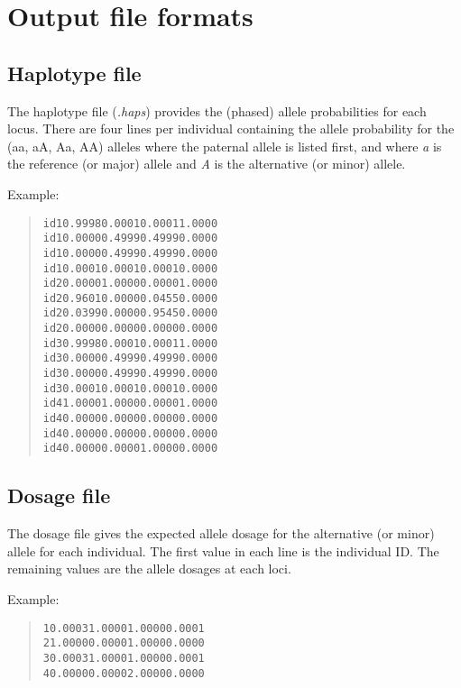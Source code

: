 \documentclass[a4paper]{article}
\begin{document}
\section{Output file formats%
  \label{output-file-formats}%
}


\subsection{Haplotype file%
  \label{haplotype-file}%
}

The haplotype file (\emph{.haps}) provides the (phased) allele probabilities for each locus. There are four lines per individual containing the allele probability for the (aa, aA, Aa, AA) alleles where the paternal allele is listed first, and where \emph{a} is the reference (or major) allele and \emph{A} is the alternative (or minor) allele.

Example:

\begin{quote}
\begin{alltt}
id1    0.9998    0.0001    0.0001    1.0000
id1    0.0000    0.4999    0.4999    0.0000
id1    0.0000    0.4999    0.4999    0.0000
id1    0.0001    0.0001    0.0001    0.0000
id2    0.0000    1.0000    0.0000    1.0000
id2    0.9601    0.0000    0.0455    0.0000
id2    0.0399    0.0000    0.9545    0.0000
id2    0.0000    0.0000    0.0000    0.0000
id3    0.9998    0.0001    0.0001    1.0000
id3    0.0000    0.4999    0.4999    0.0000
id3    0.0000    0.4999    0.4999    0.0000
id3    0.0001    0.0001    0.0001    0.0000
id4    1.0000    1.0000    0.0000    1.0000
id4    0.0000    0.0000    0.0000    0.0000
id4    0.0000    0.0000    0.0000    0.0000
id4    0.0000    0.0000    1.0000    0.0000
\end{alltt}
\end{quote}


\subsection{Dosage file%
  \label{dosage-file}%
}

The dosage file gives the expected allele dosage for the alternative (or minor) allele for each individual. The first value in each line is the individual ID. The remaining values are the allele dosages at each loci.

Example:

\begin{quote}
\begin{alltt}
1    0.0003    1.0000    1.0000    0.0001
2    1.0000    0.0000    1.0000    0.0000
3    0.0003    1.0000    1.0000    0.0001
4    0.0000    0.0000    2.0000    0.0000
\end{alltt}
\end{quote}
\end{document}
